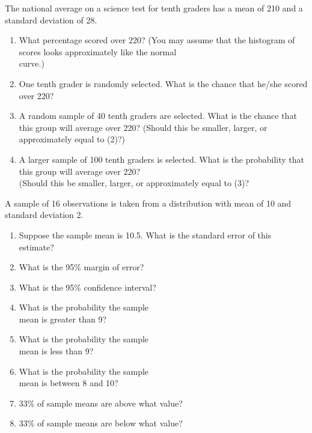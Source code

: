 \documentclass[11pt, chapterprefix=true]{scrbook}\usepackage[]{graphicx}\usepackage[]{color}
\begin{document}
\begin{exercises}
\begin{exercise}  %

The national average on a science test for tenth graders has a mean of 210 and a standard deviation of 28.

\begin{enumerate}
  \item What percentage scored over 220?  (You may assume that the histogram of scores looks approximately like the normal \\ curve.)
  \item One tenth grader is randomly selected.  What is the chance that he/she scored over 220?
  \item A random sample of 40 tenth graders are selected.  What is the chance that this group will average over 220? (Should this be smaller, larger, or approximately equal to (2)?)
  \item A larger sample of 100 tenth graders is selected.  What is the probability that this group will average over 220?  \\ (Should this be smaller, larger, or approximately equal to (3)?
\end{enumerate}

\end{exercise}
\begin{solution}  %

\end{solution}

\begin{exercise}  %

A sample of 16 observations is taken from a distribution with mean of 10 and standard deviation 2.

\begin{enumerate}
  \item Suppose the sample mean is 10.5. What is the standard error of this estimate?
  \item What is the 95\% margin of error?
  \item What is the 95\% confidence interval?
  \item What is the probability the sample \\ mean is greater than 9?
  \item What is the probability the sample \\ mean is less than 9? 
  \item What is the probability the sample \\ mean is between 8 and 10? 
  \item 33\% of sample means are above what value? 
  \item 33\% of sample means are below what value?
\end{enumerate}
\end{exercise}
\begin{solution}  %


\end{solution}
\end{exercises}
\end{document}
